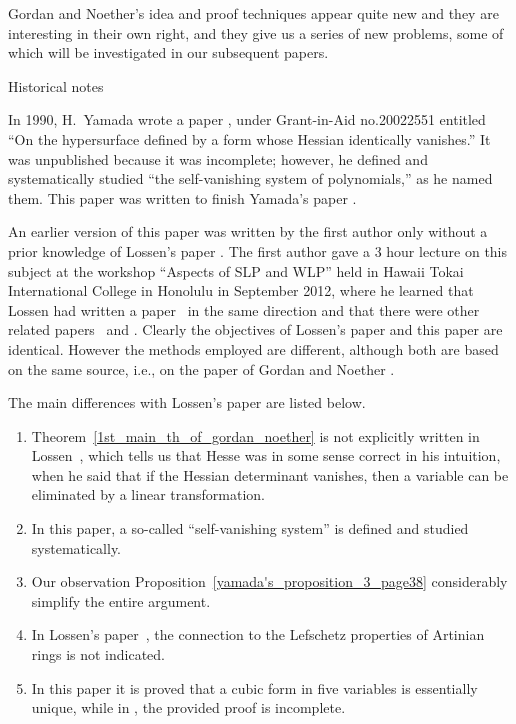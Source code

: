 \documentclass[12pt]{article}
\theoremstyle{definition}
\theoremstyle{remark}
\begin{document}
Gordan and Noether's idea and proof techniques appear quite new and they are interesting in 
their own right, 
and they give us a series of new problems, some of which will be investigated 
in our subsequent papers. 

\begin{center}
\vskip 0.2cm
{Historical notes}
\end{center}

\vskip 0.2cm
In 1990, H.\ Yamada wrote a paper \cite{HY}, under  Grant-in-Aid no.\@ 20022551 entitled 
``On the hypersurface defined by a form whose Hessian identically vanishes.'' 
It was unpublished because it was incomplete; however,  he defined and systematically studied 
``the self-vanishing system of polynomials,'' as he named them.  
This paper was written to finish Yamada's paper \cite{HY}.   

An earlier version of this paper was written by the first author only without 
a prior knowledge of Lossen's paper \cite{clossen}. The first author 
gave a 3 hour lecture on this subject at the workshop ``Aspects of SLP and WLP'' 
held in Hawaii Tokai International College in Honolulu in September 2012, where  
he learned that Lossen  had written a paper~\cite{clossen} in the same direction and that there were  
other related papers~\cite{ciliberto_russo_francesco_simis} and \cite{garbagnati_repetto}.    
Clearly the objectives  of Lossen's paper and this paper are identical.  However 
the methods employed are different, although both are based on the same 
source, i.e., on the paper of Gordan and Noether \cite{GNzzz}. 

The main differences with Lossen's paper are listed below.  
\begin{enumerate}
\item
Theorem~\ref{1st_main_th_of_gordan_noether}
is not explicitly written in Lossen~\cite{clossen}, which tells us  that Hesse was 
in some sense correct in his intuition, when he said that if the Hessian determinant 
vanishes, then a variable can be eliminated by a linear transformation.    
\item
In this paper, a so-called ``self-vanishing system'' is defined and studied systematically.  
\item
Our observation Proposition~\ref{yamada's_proposition_3_page38}  
considerably simplify the entire argument.
\item
In Lossen's paper~\cite{clossen}, the connection to the Lefschetz properties of Artinian rings 
is not indicated.   

\item 
In this paper it is proved that a cubic form in five variables is essentially unique, 
while in \cite{clossen}, the provided proof is incomplete.
\end{enumerate}
\end{document}
